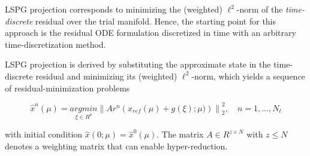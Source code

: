 LSPG projection corresponds to minimizing the (weighted) $\ell^2$-\/norm of the {\itshape time-\/discrete} residual over the trial manifold. Hence, the starting point for this approach is the residual ODE formulation discretized in time with an arbitrary time-\/discretization method.

LSPG projection is derived by substituting the approximate state in the time-\/discrete residual and minimizing its (weighted) $\ell^2$-\/norm, which yields a sequence of residual-\/minimization problems 

\[ \hat{x}^n(\mu) = \underset{\xi \in R^{p}}{arg min} \left\| A r^{n}\left(x_{ref}(\mu)+g(\xi);\mu)\right) \right\|_2^2,\quad n=1,\ldots,N_t \]

with initial condition $\hat{x}(0;\mu)=\hat{x}^0(\mu)$. The matrix $A \in R^{z \times N}$ with $z \leq N$ denotes a weighting matrix that can enable hyper-\/reduction. 